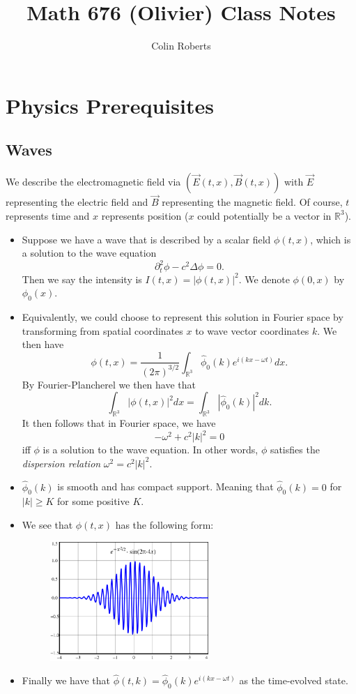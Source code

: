 \documentclass[leqno]{article}
\author{Colin Roberts}
\title{Math 676 (Olivier) Class Notes}
\theoremstyle{definition}
\theoremstyle{remark}
\theoremstyle{theorem}
\newcommand{\R}{\mathbb{R}}
\begin{document}
\maketitle
\tableofcontents
\pagebreak

\section{Physics Prerequisites}	
\subsection{Waves}  

We describe the electromagnetic field via $(\vec{E}(t,x), \vec{B}(t,x))$ with $\vec{E}$ representing the electric field and $\vec{B}$ representing the magnetic field.  Of course, $t$ represents time and $x$ represents position ($x$ could potentially be a vector in $\R^3$).

\begin{itemize}
\item Suppose we have a wave that is described by a scalar field $\phi(t,x)$, which is a solution to the wave equation
\[
\partial_t^2 \phi - c^2 \Delta \phi = 0.
\]
Then we say the intensity is $I(t,x)=|\phi(t,x)|^2$. We denote $\phi(0,x)$ by $\phi_0 (x)$. 
\item Equivalently, we could choose to represent this solution in Fourier space by transforming from spatial coordinates $x$ to wave vector coordinates $k$.  We then have
\[
\phi(t,x)=\frac{1}{(2\pi)^{3/2}} \int_{\R^3} \hat{\phi}_0 (k) e^{i(kx-\omega t)} dx.
\]
By Fourier-Plancherel we then have that 
\[
\int_{\R^3} |\phi(t,x)|^2 dx = \int_{\R^3} |\hat{\phi}_0 (k)|^2 dk.
\]
It then follows that in Fourier space, we have 
\[
-\omega^2 +c^2 |k|^2=0
\]
iff $\phi$ is a solution to the wave equation. In other words, $\phi$ satisfies the \emph{dispersion relation} $\omega^2 = c^2 |k|^2$.

\item $\hat{\phi}_0(k)$ is smooth and has compact support.  Meaning that $\hat{\phi}_0(k)=0$ for $|k|\geq K$ for some positive $K$.  

\item We see that $\phi(t,x)$ has the following form:
\begin{center}
\begin{figure}[h]
\includegraphics[width=6cm]{wavepacket.png}
\end{figure}  
\end{center}

\item Finally we have that $\hat{\phi}(t,k)=\hat{\phi}_0 (k)e^{i(kx-\omega t)}$ as the time-evolved state.

\end{itemize}
\end{document}
